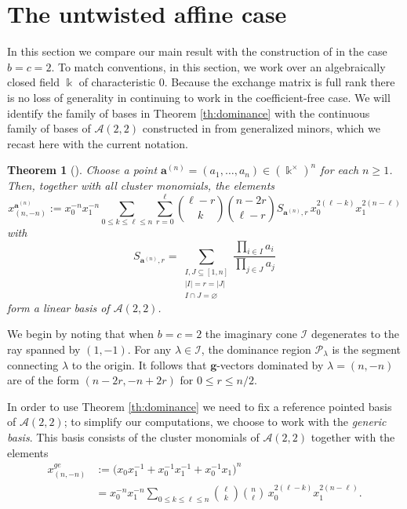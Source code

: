 \documentclass[pdflatex,sn-mathphys]{sn-jnl}%
\theoremstyle{thmstyleone}%
\newtheorem{theorem}{Theorem}[section]%
\theoremstyle{thmstyletwo}%
\theoremstyle{thmstylethree}%
\newcommand{\bfa}{\boldsymbol{a}}
\newcommand{\bfg}{\boldsymbol{g}}
\newcommand{\cA}{\mathcal{A}}
\newcommand{\cI}{\mathcal{I}}
\newcommand{\cP}{\mathcal{P}}
\newcommand{\kk}{\Bbbk}
\begin{document}
\section{The untwisted affine case}
\label{sec:affine}

  In this section we compare our main result with the construction of \cite{RSW19} in the case $b=c=2$.
  To match conventions, in this section, we work over an algebraically closed field $\kk$ of characteristic 0.
  Because the exchange matrix is full rank there is no loss of generality in continuing to work in the coefficient-free case.
  We will identify the family of bases in Theorem \ref{th:dominance} with the continuous family of bases of $\cA(2,2)$ constructed in \cite{RSW19} from generalized minors, which we recast here with the current notation. 

  \begin{theorem}[{\cite[Theorem 4.6]{RSW19}}]
    \label{thm:rsw}
    Choose a point $\bfa^{(n)}=(a_1,\dots,a_n)\in(\kk^\times)^n$ for each $n\geq1$.
    Then, together with all cluster monomials, the elements 
    \begin{equation}
      \label{eq:generalized minor}
      x_{(n,-n)}^{\bfa^{(n)}}:= x_0^{-n} x_1^{-n} \sum_{0 \leq k \leq \ell \leq n} \sum_{r=0}^\ell {\ell-r\choose k} {n-2r\choose \ell-r} S_{\bfa^{(n)},r}  \, x_0^{2(\ell-k)} x_1^{2(n-\ell)}
    \end{equation}
    with
    \[
      S_{\bfa^{(n)},r}=\sum\limits_{\substack{I,J\subseteq[1,n]\\|I|=r=|J|\\ I\cap J=\varnothing}}\frac{\prod_{i\in I} a_i}{\prod_{j\in J} a_j}
    \]
    form a linear basis of $\cA(2,2)$.
  \end{theorem}

  We begin by noting that when $b=c=2$ the imaginary cone $\cI$ degenerates to the ray spanned by $(1,-1)$.
  For any $\lambda\in\cI$, the dominance region $\cP_\lambda$ is the segment connecting $\lambda$ to the origin.
  It follows that $\bfg$-vectors dominated by $\lambda=(n,-n)$ are of the form $(n-2r,-n+2r)$ for $0\leq r \leq n/2$.

  In order to use Theorem \ref{th:dominance} we need to fix a reference pointed basis of $\cA(2,2)$; to simplify our computations, we choose to work with the \emph{generic basis}.
  This basis consists of the cluster monomials of $\cA(2,2)$ together with the elements
  \begin{align*}
    x_{(n,-n)}^{ge}
    &:=
    \Big(x_0 x_1^{-1} + x_0^{-1}x_1^{-1} + x_0^{-1}x_1\Big)^n\\
    &=
    x_0^{-n} x_1^{-n}
    \sum_{0 \leq k \leq \ell \leq n}
    {\ell\choose k} {n\choose \ell}
    \, x_0^{2(\ell-k)} x_1^{2(n-\ell)}.
  \end{align*}
\end{document}

